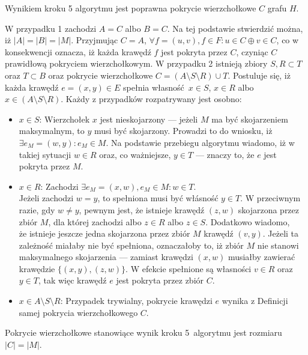 \begin{theorem}\label{theorem_nf1}
  Wynikiem kroku 5 algorytmu jest poprawna pokrycie wierzchołkowe $C$
  grafu $H$.
\end{theorem}
\begin{bproof}
  W przypadku 1 zachodzi $A = C$ albo $B = C$.
  Na tej podstawie stwierdzić można, iż ${|A|=|B|=|M|}$.
  Przyjmując $C = A$, $\forall{f=(u,v), f\in F}: u \in C \oplus v \in C$, co
  w konsekwencji oznacza, iż każda krawędź $f$ jest pokryta przez $C$, czyniąc
  $C$ prawidłową pokryciem wierzchołkowym.
  W przypadku 2 istnieją zbiory $S, R \subset T$ oraz $T \subset B$ oraz pokrycie wierzchołkowe $C=(A \setminus S \setminus R) \cup T$.
  Postuluje się, iż każda krawędź $e=(x, y) \in E$ spełnia własność $x \in S$, $x \in R$ albo $x \in (A \setminus S
  \setminus R)$.
  Każdy z przypadków rozpatrywany jest osobno:
  \begin{itemize}
    \item \underline{$x \in S$}: Wierzchołek $x$ jest nieskojarzony --- jeżeli $M$ ma być skojarzeniem 
      maksymalnym, to $y$ musi być skojarzony.
      Prowadzi to do wniosku, iż $\exists{e_M=(w,y)}: e_M \in M$.
      Na podstawie przebiegu algorytmu wiadomo, iż w takiej sytuacji $w \in R$
      oraz, co ważniejsze, $y \in T$ --- znaczy to, że $e$ jest pokryta przez $M$.
    \item \underline{$x \in R$}: Zachodzi $\exists{e_M=(x,w), e_M\in M}: w \in T$. \\
      Jeżeli zachodzi $w=y$, to spełniona musi być włásność $y \in T$.
      W przeciwnym razie, gdy $w \neq y$, pewnym jest, że istnieje krawędź $(z,w)$ skojarzona przez zbiór $M$, dla której zachodzi albo $z \in R$ albo $z \in S$.
      Dodatkowo wiadomo,\\że istnieje jeszcze jedna skojarzona przez zbiór $M$ krawędź $(v, y)$.
      Jeżeli ta zależność miałaby nie być spełniona, oznaczałoby to, iż zbiór $M$ nie stanowi maksymalnego skojarzenia --- zamiast krawędzi $(x,w)$ musiałby zawierać krawędzie $\{(x,y),(z,w)\}$.
      W efekcie spełnione są własności $v \in R$ oraz $y \in T$, tak więc krawędź $e$ jest pokryta przez zbiór $C$.
    \item \underline{$x \in A \setminus S \setminus R$}: Przypadek trywialny,
      pokrycie krawędzi $e$ wynika z Definicji samej pokrycia wierzchołkowego $C$.
  \end{itemize}
\end{bproof}
\begin{theorem}
  Pokrycie wierzchołkowe stanowiące wynik kroku 5\ algorytmu jest rozmiaru $|C| = |M|$. 
\end{theorem}
